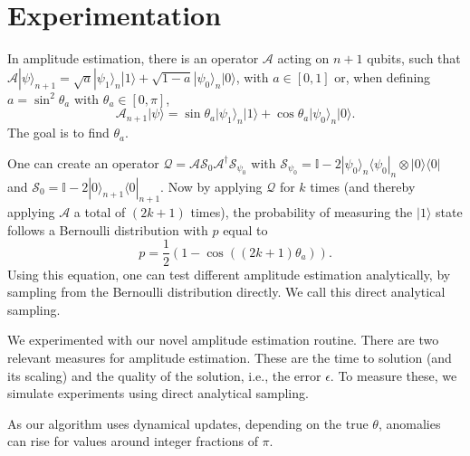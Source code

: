\documentclass[a4paper,onecolumn,11pt,unpublished]{quantumarticle}
\newcommand{\bra}[1]{
  \langle #1|
}
\newcommand{\ket}[1]{
  |#1\rangle
}
\begin{document}
\section{Experimentation}

In amplitude estimation, there is an operator $\mathcal{A}$ acting on $n+1$ qubits, such that $\mathcal{A} \ket{\psi}_{n+1} = \sqrt{a}\ket{\psi_1}_{n}\ket{1} + \sqrt{1-a}\ket{\psi_0}_n\ket{0}$,
with $a\in [0,1]$ or, when defining $a=\sin^2{\theta_a}$ with $\theta_a \in [0, \pi]$,
\begin{equation}
	\mathcal{A}_{n+1} \ket{\psi} = \sin{\theta_a} \ket{\psi_1}_n \ket{1}
	+ \cos{\theta_a}\ket{\psi_0}_n\ket{0}.
\end{equation}
The goal is to find $\theta_a$.

One can create an operator $\mathcal{Q} = \mathcal{A} \mathcal{S}_0 \mathcal{A}^{\dagger}\mathcal{S}_{\psi_0}$ with $\mathcal{S}_{\psi_0} = \mathbb{I} - 2\ket{\psi_0}_n\bra{\psi_0}_n\otimes\ket{0}\bra{0}$ and $\mathcal{S}_0 = \mathbb{I} - 2\ket{0}_{n+1}\bra{0}_{n+1}$. %
Now by applying $\mathcal{Q}$ for $k$ times (and thereby applying $\mathcal{A}$ a total of $(2k+1)$ times), the probability of measuring the $\ket{1}$ state follows a Bernoulli distribution with $p$ equal to
\begin{equation}
	p = \frac{1}{2}(1-\cos{((2k+1)\theta_a)}).
	\label{eq:bernoulli-p}
\end{equation}
Using this equation, one can test different amplitude estimation analytically, by sampling from the Bernoulli distribution directly. We call this direct analytical sampling.

We experimented with our novel amplitude estimation routine. There are two relevant measures for amplitude estimation.
These are the time to solution (and its scaling) and the quality of the solution, i.e., the error $\epsilon$.
To measure these, we simulate experiments using direct analytical sampling.


As our algorithm uses dynamical updates, depending on the true $\theta$, %
anomalies can rise for values around integer fractions of $\pi$.
\end{document}
